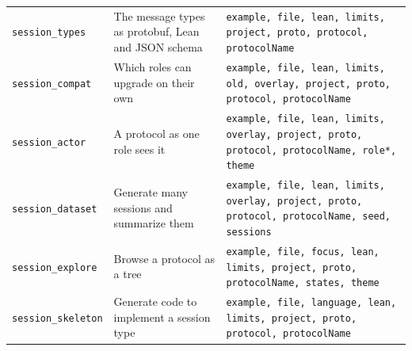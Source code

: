 \begin{tabular}{@{}p{}p{}p{}@{}}
\texttt{session\_\allowbreak{}types} & The message types as protobuf, Lean and JSON schema & \texttt{example, file, lean, limits, project, proto, protocol, protocolName} \\
\texttt{session\_\allowbreak{}compat} & Which roles can upgrade on their own & \texttt{example, file, lean, limits, old, overlay, project, proto, protocol, protocolName} \\
\texttt{session\_\allowbreak{}actor} & A protocol as one role sees it & \texttt{example, file, lean, limits, overlay, project, proto, protocol, protocolName, role*, theme} \\
\texttt{session\_\allowbreak{}dataset} & Generate many sessions and summarize them & \texttt{example, file, lean, limits, overlay, project, proto, protocol, protocolName, seed, sessions} \\
\texttt{session\_\allowbreak{}explore} & Browse a protocol as a tree & \texttt{example, file, focus, lean, limits, project, proto, protocolName, states, theme} \\
\texttt{session\_\allowbreak{}skeleton} & Generate code to implement a session type & \texttt{example, file, language, lean, limits, project, proto, protocol, protocolName} \\
\bottomrule
\end{tabular}
